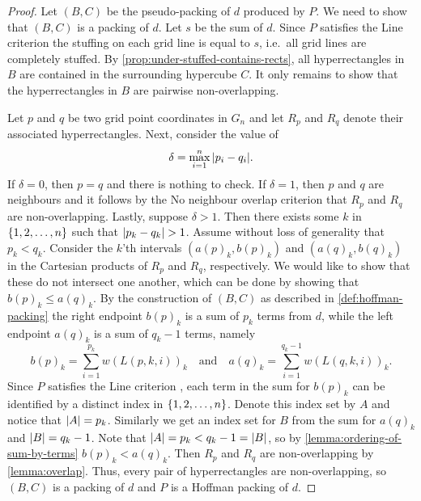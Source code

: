 \begin{proof}
Let $(B, C)$ be the pseudo-packing of $d$ produced by $P$. We need to show that $(B, C)$ is a packing of $d$. Let $s$ be the sum of $d$. Since $P$ satisfies the Line criterion  the stuffing on each grid line is equal to $s$, i.e.\ all grid lines are completely stuffed. By \cref{prop:under-stuffed-contains-rects}, all hyperrectangles in $B$ are contained in the surrounding hypercube $C$. It only remains to show that the hyperrectangles in $B$ are pairwise non-overlapping.

Let $p$ and $q$ be two grid point coordinates in $G_n$ and let $R_p$ and $R_q$ denote their associated hyperrectangles. Next, consider the value of
\[
\delta = \max_{i = 1}^n \, \lvert p_i - q_i\rvert.
\]
If $\delta = 0$, then $p = q$ and there is nothing to check. If $\delta = 1$, then $p$ and $q$ are neighbours and it follows by the No neighbour overlap criterion  that $R_p$ and $R_q$ are non-overlapping. Lastly, suppose $\delta > 1$. Then there exists some $k$ in $\left\{ 1, 2, \dotsc, n \right\}$ such that $\lvert p_k - q_k\rvert > 1$. Assume without loss of generality that $p_k < q_k$. Consider the $k$'th intervals $(a(p)_k, b(p)_k)$ and $(a(q)_k, b(q)_k)$ in the Cartesian products of $R_p$ and $R_q$, respectively. We would like to show that these do not intersect one another, which can be done by showing that $b(p)_k \leq a(q)_k$. By the construction of $(B, C)$ as described in \cref{def:hoffman-packing} the right endpoint $b(p)_k$ is a sum of $p_k$ terms from $d$, while the left endpoint $a(q)_k$ is a sum of $q_k - 1$ terms, namely
\[
b(p)_k = \sum_{i = 1}^{p_k} w(L(p, k, i))_k
\quad \text{and} \quad
a(q)_k = \sum_{i = 1}^{q_k - 1} w(L(q, k, i))_k.
\]
Since $P$ satisfies the Line criterion , each term in the sum for $b(p)_k$ can be identified by a distinct index in $\left\{ 1, 2, \dotsc, n \right\}$. Denote this index set by $A$ and notice that $\lvert A\rvert = p_k$. Similarly we get an index set for $B$ from the sum for $a(q)_k$ and $\lvert B\rvert = q_k - 1$. Note that $\lvert A\rvert = p_k < q_k - 1 = \lvert B\rvert$, so by \cref{lemma:ordering-of-sum-by-terms} $b(p)_k < a(q)_k$. Then $R_p$ and $R_q$ are non-overlapping by \cref{lemma:overlap}. Thus, every pair of hyperrectangles are non-overlapping, so $(B, C)$ is a packing of $d$ and $P$ is a Hoffman packing of $d$.
\end{proof}

